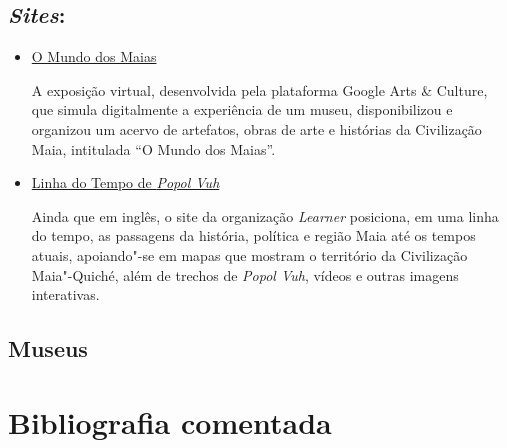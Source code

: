 \documentclass[11pt]{extarticle}
\begin{document}
\subsection{\emph{Sites}:}

\begin{itemize}
\item \href{https://artsandculture.google.com/project/exploring-the-maya-world}{O Mundo dos Maias}

A exposição virtual, desenvolvida pela plataforma Google Arts \& Culture, que simula digitalmente 
a experiência de um museu, disponibilizou e organizou um acervo de artefatos, obras de arte e 
histórias da Civilização Maia, intitulada ``O Mundo dos Maias''.

\item\href{https://www.learner.org/series/invitation-to-world-literature/popol-vuh/popol-vuh-map-timeline}{Linha do Tempo de \textit{Popol Vuh}}

Ainda que em inglês, o site da organização \textit{Learner} posiciona, em uma linha do tempo, as 
passagens da história, política e região Maia até os tempos atuais, apoiando"-se em mapas que mostram o território da 
Civilização Maia"-Quiché, além de trechos de \textit{Popol Vuh}, vídeos e outras imagens interativas. 
\end{itemize}

\subsection{Museus}

\section{Bibliografia comentada}
\end{document}
